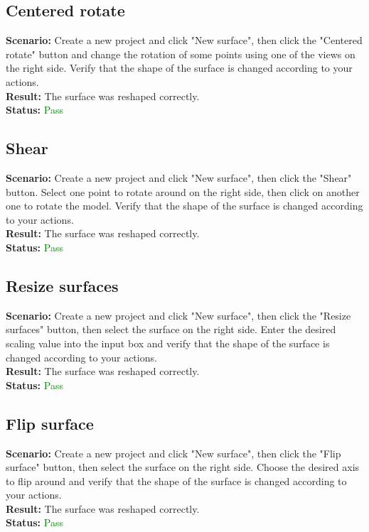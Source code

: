 \documentclass[a4paper, 11pt, article]{report}
\begin{document}
\subsection{Centered rotate}

\noindent \textbf{Scenario:} Create a new project and click "New surface", then click the "Centered rotate" button and change the rotation of some points using one of the views on the right side. Verify that the shape of the surface is changed according to your actions.
\\
\noindent \textbf{Result:} The surface was reshaped correctly.
\\
\noindent \textbf{Status:} \textcolor{green}{Pass}

\subsection{Shear}

\noindent \textbf{Scenario:} Create a new project and click "New surface", then click the "Shear" button. Select one point to rotate around on the right side, then click on another one to rotate the model. Verify that the shape of the surface is changed according to your actions.
\\
\noindent \textbf{Result:} The surface was reshaped correctly.
\\
\noindent \textbf{Status:} \textcolor{green}{Pass}

\subsection{Resize surfaces}

\noindent \textbf{Scenario:} Create a new project and click "New surface", then click the "Resize surfaces" button, then select the surface on the right side. Enter the desired scaling value into the input box and verify that the shape of the surface is changed according to your actions.
\\
\noindent \textbf{Result:} The surface was reshaped correctly.
\\
\noindent \textbf{Status:} \textcolor{green}{Pass}

\subsection{Flip surface}

\noindent \textbf{Scenario:} Create a new project and click "New surface", then click the "Flip surface" button, then select the surface on the right side. Choose the desired axis to flip around and verify that the shape of the surface is changed according to your actions.
\\
\noindent \textbf{Result:} The surface was reshaped correctly.
\\
\noindent \textbf{Status:} \textcolor{green}{Pass}
\end{document}
